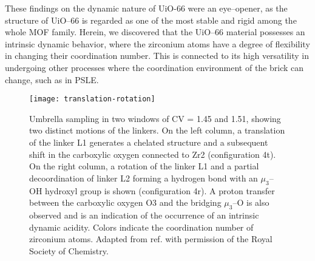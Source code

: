 \npar
These findings on the dynamic nature of UiO-66 were an eye--opener, as the structure of UiO--66 is regarded as one of the most stable and rigid among the whole MOF family. Herein, we discovered that the UiO--66 material possesses an intrinsic dynamic behavior, where the zirconium atoms have a degree of flexibility in changing their coordination number. This is connected to its high versatility in undergoing other processes where the coordination environment of the brick can change, such as in PSLE.
\npar
\begin{figure}[!htbp]
	\centering
	\texttt{[image: translation-rotation]}
	\caption{Umbrella sampling in two windows of CV = 1.45 and 1.51, showing two distinct motions of the linkers. On the left column, a translation of the linker L1 generates a chelated structure and a subsequent shift in the carboxylic oxygen connected to Zr2 (configuration 4t). On the right column, a rotation of the linker L1 and a partial decoordination of linker L2 forming a hydrogen bond with an $\mu_3$--OH hydroxyl group is shown (configuration 4r). A proton transfer between the carboxylic oxygen O3 and the bridging $\mu_3$--O is also observed and is an indication of the occurrence of an intrinsic dynamic acidity. Colors indicate the coordination number of zirconium atoms. Adapted from ref. \cite{hajek2018intrinsic} with permission of the Royal Society of Chemistry.}
	\label{fig:translation-rotation}
\end{figure}
\newpage

